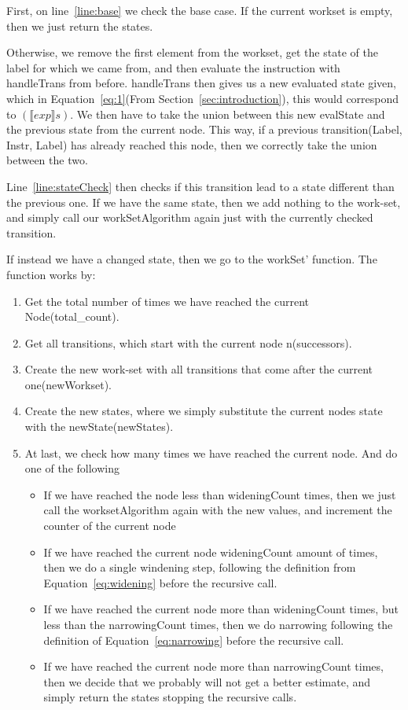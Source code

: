 First, on line~\ref{line:base} we check the base case. If the current workset
is empty, then we just return the states.

Otherwise, we remove the first element from the workset, get the state of the
label for which we came from, and then evaluate the instruction with
handleTrans from before. handleTrans then gives us a new evaluated state given,
which in Equation~\ref{eq:1}(From Section~\ref{sec:introduction}), this would
correspond to $(\llbracket exp \rrbracket s)$. We then have to take the union
between this new evalState and the previous state from the current node. This
way, if a previous transition(Label, Instr, Label) has already reached this
node, then we correctly take the union between the two.

Line~\ref{line:stateCheck} then checks if this transition lead to a state
different than the previous one. If we have the same state, then we add nothing
to the work-set, and simply call our workSetAlgorithm again just with the
currently checked transition.

If instead we have a changed state, then we go to the workSet' function. The function works by:
\begin{enumerate}
  \item Get the total number of times we have reached the current Node(total\_count).
  \item Get all transitions, which start with the current node n(successors).
  \item Create the new work-set with all transitions that come after the current one(newWorkset).
  \item Create the new states, where we simply substitute the current nodes state with the newState(newStates).
  \item At last, we check how many times we have reached the current node. And do one of the following
    \begin{itemize}
      \item If we have reached the node less than wideningCount times, then we just call the worksetAlgorithm again with the new values, and increment the counter of the current node
      \item If we have reached the current node wideningCount amount of times, then we do a single windening step, following the definition from Equation~\ref{eq:widening} before the recursive call.
      \item If we have reached the current node more than wideningCount times, but less than the narrowingCount times, then we do narrowing following the definition of Equation~\ref{eq:narrowing} before the recursive call.
      \item If we have reached the current node more than narrowingCount times, then we decide that we probably will not get a better estimate, and simply return the states stopping the recursive calls.
    \end{itemize}
\end{enumerate}

